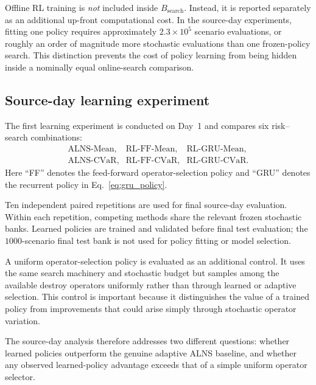 \documentclass[preprint,12pt]{elsarticle}
\newcommand{\1}{\mathbf{1}}
\begin{document}
Offline RL training is \emph{not} included inside
$B_{\mathrm{search}}$. Instead, it is reported separately as an additional
up-front computational cost. In the source-day experiments, fitting one policy
requires approximately $2.3\times10^5$ scenario evaluations, or roughly an order
of magnitude more stochastic evaluations than one frozen-policy search.
This distinction prevents the cost of policy learning from being hidden inside
a nominally equal online-search comparison.

\subsection{Source-day learning experiment}
\label{subsec:source_day_rl}

The first learning experiment is conducted on Day~1 and compares six
risk--search combinations:
\[
\begin{array}{lll}
	\text{ALNS-Mean},      &
	\text{RL-FF-Mean},     &
	\text{RL-GRU-Mean},
	\\
	\text{ALNS-CVaR},      &
	\text{RL-FF-CVaR},     &
	\text{RL-GRU-CVaR}.
\end{array}
\]
Here ``FF'' denotes the feed-forward operator-selection policy and ``GRU''
denotes the recurrent policy in Eq.~\eqref{eq:gru_policy}.

Ten independent paired repetitions are used for final source-day evaluation.
Within each repetition, competing methods share the relevant frozen stochastic
banks. Learned policies are trained and validated before final test evaluation;
the $1000$-scenario final test bank is not used for policy fitting or
model selection.

A uniform operator-selection policy is evaluated as an additional control.
It uses the same search machinery and stochastic budget but samples among the
available destroy operators uniformly rather than through learned or adaptive
selection. This control is important because it distinguishes the value of a
trained policy from improvements that could arise simply through stochastic
operator variation.

The source-day analysis therefore addresses two different questions:
whether learned policies outperform the genuine adaptive ALNS baseline, and
whether any observed learned-policy advantage exceeds that of a simple uniform
operator selector.

\end{document}
